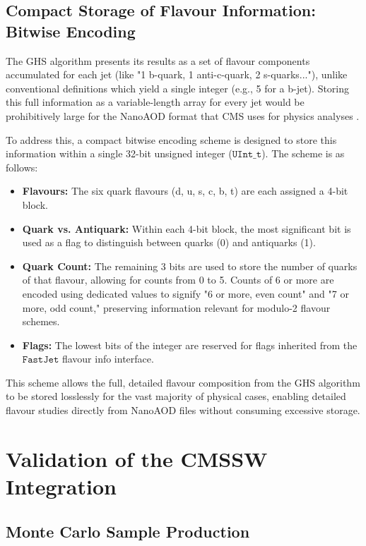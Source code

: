 \documentclass[10pt,twocolumn]{article}
\begin{document}
\subsection{Compact Storage of Flavour Information: Bitwise Encoding}
\label{sec:integration-storage}

The GHS algorithm presents its results as a set of flavour components accumulated for each jet (like "1 b-quark, 1 anti-c-quark, 2 s-quarks..."), unlike conventional definitions which yield a single integer (e.g., 5 for a b-jet). Storing this full information as a variable-length array for every jet would be prohibitively large for the NanoAOD format that CMS uses for physics analyses \cite{CMS_NANOAOD_2020}.

To address this, a compact bitwise encoding scheme is designed to store this information within a single 32-bit unsigned integer ($\texttt{UInt\_t}$). The scheme is as follows:
\begin{itemize}
    \item \textbf{Flavours:} The six quark flavours (d, u, s, c, b, t) are each assigned a 4-bit block.
    \item \textbf{Quark vs. Antiquark:} Within each 4-bit block, the most significant bit is used as a flag to distinguish between quarks (0) and antiquarks (1).
    \item \textbf{Quark Count:} The remaining 3 bits are used to store the number of quarks of that flavour, allowing for counts from 0 to 5. Counts of 6 or more are encoded using dedicated values to signify "6 or more, even count" and "7 or more, odd count," preserving information relevant for modulo-2 flavour schemes.
    \item \textbf{Flags:} The lowest bits of the integer are reserved for flags inherited from the $\texttt{FastJet}$ flavour info interface.
\end{itemize}
This scheme allows the full, detailed flavour composition from the GHS algorithm to be stored losslessly for the vast majority of physical cases, enabling detailed flavour studies directly from NanoAOD files without consuming excessive storage.

\section{Validation of the CMSSW Integration} %
\label{sec:vali}

\subsection{Monte Carlo Sample Production} %
\label{sec:vali-mcprod}
\end{document}
